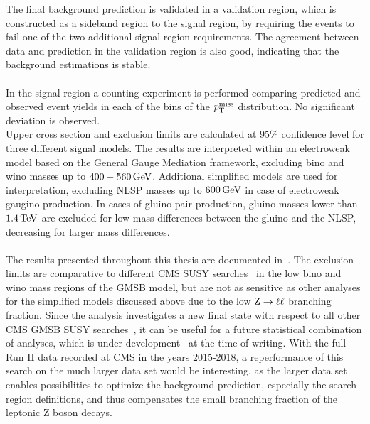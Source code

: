 The final background prediction is validated in a validation region, which is constructed as a sideband region to the signal region, by requiring the events to fail one of the two additional signal region requirements. The agreement between data and prediction in the validation region is also good, indicating that the background estimations is stable.\\\\
In the signal region a counting experiment is performed comparing predicted and observed event yields in each of the bins of the $p_{\mathrm{T}}^\text{miss}$ distribution. No significant deviation is observed.\\
Upper cross section and exclusion limits are calculated at $95\%$ confidence level for three different signal models. The results are interpreted within an electroweak model based on the General Gauge Mediation framework, excluding bino and wino masses up to $400-560\,\text{Ge\hspace{-.08em}V}$. Additional simplified models are used for interpretation, excluding NLSP masses up to $600\,\text{Ge\hspace{-.08em}V}$ in case of electroweak gaugino production. In cases of gluino pair production, gluino masses lower than $1.4\,\text{Te\hspace{-.08em}V}$ are excluded for low mass differences between the gluino and the NLSP, decreasing for larger mass differences.\\\\
The results presented throughout this thesis are documented in~\cite{MyAN}. The exclusion limits are comparative to different CMS SUSY searches~\cite{PhotonMet} in the low bino and wino mass regions of the GMSB model, but are not as sensitive as other analyses for the simplified models discussed above due to the low $\mathrm{Z}\to\ell\ell$ branching fraction. Since the analysis investigates a new final state with respect to all other CMS GMSB SUSY searches~\cite{PhotonMet,PhotonHT,PhotonBJet}, it can be useful for a future statistical combination of analyses, which is under development~\cite{Danilo} at the time of writing. With the full Run II data recorded at CMS in the years 2015-2018, a reperformance of this search on the much larger data set would be interesting, as the larger data set enables possibilities to optimize the background prediction, especially the search region definitions, and thus compensates the small branching fraction of the leptonic Z boson decays.
